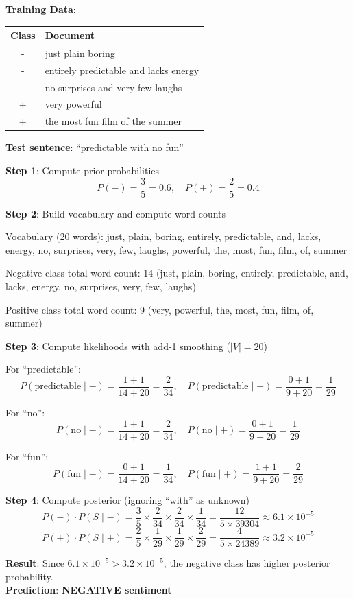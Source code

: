 \documentclass[11pt,a4paper]{article}
\begin{document}
\begin{tcolorbox}[colback=green!5!white,colframe=green!75!black,title=\textbf{Numerical: Naive Bayes Sentiment Classification}]
\textbf{Training Data}:
\begin{center}
\begin{tabular}{|c|l|}
\hline
\textbf{Class} & \textbf{Document} \\ \hline
- & just plain boring \\ \hline
- & entirely predictable and lacks energy \\ \hline
- & no surprises and very few laughs \\ \hline
+ & very powerful \\ \hline
+ & the most fun film of the summer \\ \hline
\end{tabular}
\end{center}

\textbf{Test sentence}: ``predictable with no fun''

\textbf{Step 1}: Compute prior probabilities
\[
P(-) = \frac{3}{5} = 0.6, \quad P(+) = \frac{2}{5} = 0.4
\]

\textbf{Step 2}: Build vocabulary and compute word counts

Vocabulary (20 words): just, plain, boring, entirely, predictable, and, lacks, energy, no, surprises, very, few, laughs, powerful, the, most, fun, film, of, summer

Negative class total word count: 14 (just, plain, boring, entirely, predictable, and, lacks, energy, no, surprises, very, few, laughs)

Positive class total word count: 9 (very, powerful, the, most, fun, film, of, summer)

\textbf{Step 3}: Compute likelihoods with add-1 smoothing ($|V| = 20$)

For ``predictable'':
\[
P(\text{predictable} \mid -) = \frac{1+1}{14+20} = \frac{2}{34}, \quad
P(\text{predictable} \mid +) = \frac{0+1}{9+20} = \frac{1}{29}
\]

For ``no'':
\[
P(\text{no} \mid -) = \frac{1+1}{14+20} = \frac{2}{34}, \quad
P(\text{no} \mid +) = \frac{0+1}{9+20} = \frac{1}{29}
\]

For ``fun'':
\[
P(\text{fun} \mid -) = \frac{0+1}{14+20} = \frac{1}{34}, \quad
P(\text{fun} \mid +) = \frac{1+1}{9+20} = \frac{2}{29}
\]

\textbf{Step 4}: Compute posterior (ignoring ``with'' as unknown)
\[
P(-) \cdot P(S \mid -) = \frac{3}{5} \times \frac{2}{34} \times \frac{2}{34} \times \frac{1}{34} = \frac{12}{5 \times 39304} \approx 6.1 \times 10^{-5}
\]
\[
P(+) \cdot P(S \mid +) = \frac{2}{5} \times \frac{1}{29} \times \frac{1}{29} \times \frac{2}{29} = \frac{4}{5 \times 24389} \approx 3.2 \times 10^{-5}
\]

\textbf{Result}: Since $6.1 \times 10^{-5} > 3.2 \times 10^{-5}$, the negative class has higher posterior probability.\\
\textbf{Prediction}: \textbf{NEGATIVE sentiment}
\end{tcolorbox}
\end{document}
